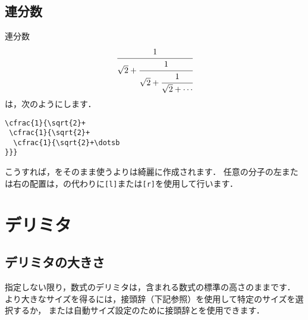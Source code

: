 \subsection{連分数}

連分数
\begin{equation}
\cfrac{1}{\sqrt{2}+
 \cfrac{1}{\sqrt{2}+
  \cfrac{1}{\sqrt{2}+\cdots
}}}
\end{equation}
は，次のようにします．
{\samepage
\begin{verbatim}
\cfrac{1}{\sqrt{2}+
 \cfrac{1}{\sqrt{2}+
  \cfrac{1}{\sqrt{2}+\dotsb
}}}
\end{verbatim}
}%
こうすれば，をそのまま使うよりは綺麗に作成されます．
任意の分子の左または右の配置は，の代わりに\verb|[l]|または\verb|[r]|を使用して行います．


\section{デリミタ}\label{delim}

\subsection{デリミタの大きさ}\label{bigdel}

指定しない限り，数式のデリミタは，含まれる数式の標準の高さのままです．
より大きなサイズを得るには，接頭辞（下記参照）を使用して特定のサイズを選択するか，
または自動サイズ設定のために接頭辞とを使用できます．


